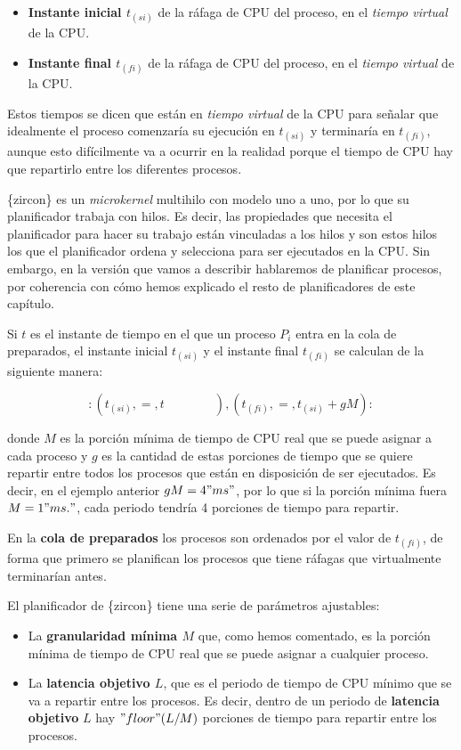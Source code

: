\begin{itemize}
\item
  \textbf{Instante inicial \(t_(si)\)} de la ráfaga de CPU del proceso,
  en el \emph{tiempo virtual} de la CPU.
\item
  \textbf{Instante final \(t_(fi)\)} de la ráfaga de CPU del proceso, en
  el \emph{tiempo virtual} de la CPU.
\end{itemize}

Estos tiempos se dicen que están en \emph{tiempo virtual} de la CPU para
señalar que idealmente el proceso comenzaría su ejecución en \(t_(si)\)
y terminaría en \(t_(fi)\), aunque esto difícilmente va a ocurrir en la
realidad porque el tiempo de CPU hay que repartirlo entre los diferentes
procesos.

\{zircon\} es un \emph{microkernel} multihilo con modelo uno a uno, por
lo que su planificador trabaja con hilos. Es decir, las propiedades que
necesita el planificador para hacer su trabajo están vinculadas a los
hilos y son estos hilos los que el planificador ordena y selecciona para
ser ejecutados en la CPU. Sin embargo, en la versión que vamos a
describir hablaremos de planificar procesos, por coherencia con cómo
hemos explicado el resto de planificadores de este capítulo.

Si \(t\) es el instante de tiempo en el que un proceso \(P_i\) entra en
la cola de preparados, el instante inicial \(t_(si)\) y el instante
final \(t_(fi)\) se calculan de la siguiente manera:

\[{: (t_(si), =, t\qquad\qquad), (t_(fi), =, t_(si) + gM):}\]

donde \(M\) es la porción mínima de tiempo de CPU real que se puede
asignar a cada proceso y \(g\) es la cantidad de estas porciones de
tiempo que se quiere repartir entre todos los procesos que están en
disposición de ser ejecutados. Es decir, en el ejemplo anterior
\(gM = 4" ms"\), por lo que si la porción mínima fuera \(M = 1" ms."\),
cada periodo tendría 4 porciones de tiempo para repartir.

En la \textbf{cola de preparados} los procesos son ordenados por el
valor de \(t_(fi)\), de forma que primero se planifican los procesos que
tiene ráfagas que virtualmente terminarían antes.

El planificador de \{zircon\} tiene una serie de parámetros ajustables:

\begin{itemize}
\item
  La \textbf{granularidad mínima \(M\)} que, como hemos comentado, es la
  porción mínima de tiempo de CPU real que se puede asignar a cualquier
  proceso.
\item
  La \textbf{latencia objetivo \(L\)}, que es el periodo de tiempo de
  CPU mínimo que se va a repartir entre los procesos. Es decir, dentro
  de un periodo de \textbf{latencia objetivo} \(L\) hay
  \("floor"(L / M)\) porciones de tiempo para repartir entre los
  procesos.
\end{itemize}

